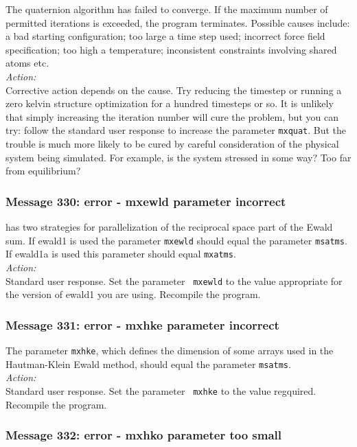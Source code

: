 The quaternion algorithm has failed to converge. If the
maximum number of permitted iterations is exceeded, the program
terminates. Possible causes include: a bad starting configuration; too
large a time step used; incorrect force field specification; too high
a temperature; inconsistent constraints involving shared atoms etc. \\ 

\noindent
{\em Action:}\\ Corrective action depends on the cause. Try reducing
the timestep or running a zero kelvin structure optimization for a
hundred timesteps or so.  It is unlikely that simply increasing the
iteration number will cure the problem, but you can try: follow the
standard user response to increase the parameter {\tt mxquat}. But the
trouble is much more likely to be cured by careful consideration of
the physical system being simulated. For example, is the system
stressed in some way? Too far from equilibrium?

\subsubsection*{Message 330: error - mxewld parameter incorrect}

\D{} has two strategies for parallelization of the reciprocal space part
of the Ewald sum. If {\sc ewald1} is used the
parameter {\tt mxewld} should equal the parameter {\tt msatms}. If
{\sc ewald1a} is used this parameter should equal {\tt mxatms}.\\

\noindent
{\em Action:} \\ Standard user response. Set the parameter {\tt
mxewld} to the value appropriate for the version of {\sc ewald1} you
are using. Recompile the program.

\subsubsection*{Message 331: error - mxhke parameter incorrect}

The parameter {\tt mxhke}, which defines the dimension of some arrays
used in the Hautman-Klein Ewald method, should equal the parameter
{\tt msatms}.\\

\noindent
{\em Action:} \\ Standard user response. Set the parameter {\tt
mxhke} to the value regquired. Recompile the program.

\subsubsection*{Message 332: error - mxhko parameter too small}

